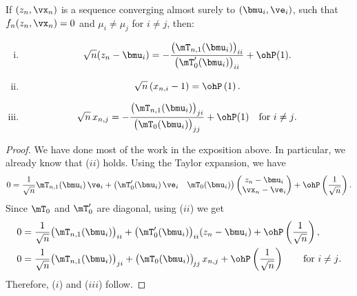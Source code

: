\begin{lemma}
    If $(z_n, \vx_n)$ is a sequence converging almost surely to 
    $(\bmu_i, \ve_i)$, such that $f_n(z_n, \vx_n) = 0$ and $\mu_i \neq \mu_j$
    for $i \neq j$, then:
    \begin{enumerate}[(i)]
        \item \[
                  \sqrt{n} ( z_n - \bmu_i) 
                  = 
                  -
                  \frac{\big(\mT_{n,1}(\bmu_i) \big)_{ii}}
                       {\big(\mT_0'(\bmu_i) \big)_{ii}}
                  +
                  \ohP(1).
              \]
        \item \[
                   \sqrt{n} \left( x_{n,i} - 1 \right)
                   =
                   \ohP\left( 1 \right).
              \]
        \item \[
                  \sqrt{n} \, x_{n,j}
                  = 
                  -
                  \frac{\big(\mT_{n,1}(\bmu_i) \big)_{ji}}
                       {\big(\mT_0(\bmu_i) \big)_{jj}}
                  +
                  \ohP(1)
                  \quad
                  \text{for $i \neq j$.}
              \]
    \end{enumerate}
    \begin{proof}
        We have done most of the work in the exposition above.  In particular,
        we already know that ($ii$) holds.  Using the Taylor expansion, we 
        have
        \[
            0
            =
            \frac{1}{\sqrt{n}}
            \mT_{n,1}(\bmu_i) \, \ve_i
            +
            \left(
            \begin{matrix}
                \mT_0'(\bmu_i) \, \ve_i & \mT_0(\bmu_i)
            \end{matrix}
            \right)
            \left(
            \begin{matrix}
                z_n - \bmu_i \\
                \vx_n - \ve_i
            \end{matrix}
            \right)
            +
            \ohP\left( \frac{1}{\sqrt{n}} \right).
        \]
        Since $\mT_0$ and $\mT_0'$ are diagonal, using ($ii$) we get
        \begin{align*}
            0
                &=
                \frac{1}{\sqrt{n}}
                \big(\mT_{n,1}(\bmu_i) \big)_{ii}
                +
                \big(\mT_0'(\bmu_i) \big)_{ii} ( z_n - \bmu_i )
                +
                \ohP\left( \frac{1}{\sqrt{n}} \right), \\
            0
                &=
                \frac{1}{\sqrt{n}}            
                \big(\mT_{n,1}(\bmu_i) \big)_{ji}
                +
                \big(\mT_0(\bmu_i) \big)_{\!jj} \,
                x_{n,j} 
                +
                \ohP\left( \frac{1}{\sqrt{n}} \right)
                \qquad \text{for $i \neq j$.}
        \end{align*}
        Therefore, ($i$) and ($iii$) follow.
    \end{proof}
\end{lemma}

